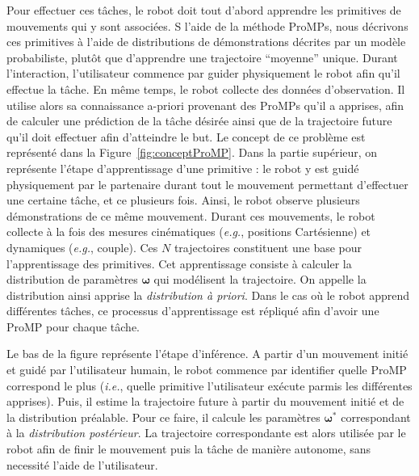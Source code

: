 \documentclass[utf8]{frontiersSCNS} %
\newcommand{\todo}[1]{\textcolor{red}{\textbf{/*#1*/}}}
\begin{document}
Pour effectuer ces tâches, le robot doit tout d'abord apprendre les primitives de mouvements qui y sont associées. S l'aide de la méthode ProMPs, nous décrivons ces primitives à l'aide de distributions de démonstrations décrites par un modèle probabiliste, plutôt que d'apprendre une trajectoire ``moyenne'' unique.
Durant l'interaction, l'utilisateur commence par guider physiquement le robot afin qu'il effectue la tâche. En même temps, le robot collecte des données d'observation. Il utilise alors sa connaissance a-priori provenant des ProMPs qu'il a apprises, afin de calculer une prédiction de la tâche désirée ainsi que de la trajectoire future qu'il doit effectuer afin d'atteindre le but.
Le concept de ce problème est représenté dans la Figure~\ref{fig:conceptProMP}.
Dans la partie supérieur, on représente l'étape d'apprentissage d'une primitive : le robot y est guidé physiquement par le partenaire durant tout le mouvement permettant d'effectuer une certaine tâche, et ce plusieurs fois. Ainsi, le robot observe plusieurs démonstrations de ce même mouvement. Durant ces mouvements, le robot collecte à la fois des mesures cinématiques (\textit{e.g.}, positions Cartésienne) et dynamiques (\textit{e.g.}, couple). Ces $N$ trajectoires  constituent une base pour l'apprentissage des primitives. Cet apprentissage consiste à calculer la distribution de paramètres $\boldsymbol{\omega}$ qui modélisent la trajectoire. On appelle la distribution ainsi apprise la \textit{distribution à priori}. 
Dans le cas où le robot apprend différentes tâches, ce processus d'apprentissage est répliqué afin d'avoir une ProMP pour chaque tâche.

Le bas de la figure représente l'étape d'inférence. A partir d'un mouvement initié et guidé par l'utilisateur humain, le robot commence par identifier quelle ProMP correspond le plus (\textit{i.e.}, quelle primitive l'utilisateur exécute parmis les différentes apprises). Puis, il estime la trajectoire future à partir du mouvement initié et de la distribution préalable. Pour ce faire, il calcule les paramètres $\boldsymbol{\omega}^*$ correspondant à la  \textit{distribution postérieur}. La trajectoire correspondante est alors utilisée par le robot afin de finir le mouvement puis la tâche de manière autonome, sans necessité l'aide de l'utilisateur.
\end{document}
